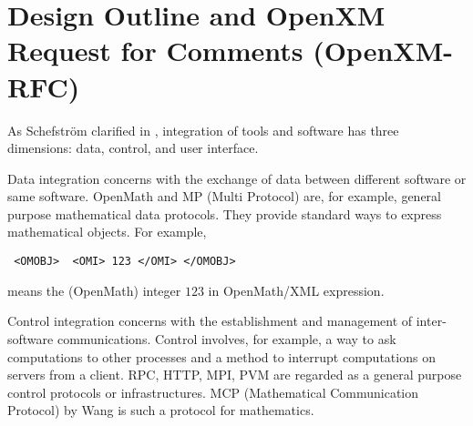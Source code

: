 
\section{Design Outline and OpenXM Request for Comments (OpenXM-RFC)} 

As Schefstr\"om clarified in \cite{schefstrom},
integration of tools and software has three dimensions:
data, control, and user interface.

Data integration concerns with the exchange of data between different
software or same software.
OpenMath \cite{OpenMath} and MP (Multi Protocol) \cite{GKW} are,
for example, general purpose mathematical data protocols.
They provide standard ways to express mathematical objects.
For example,
\begin{verbatim}
 <OMOBJ>  <OMI> 123 </OMI> </OMOBJ>
\end{verbatim}
means the (OpenMath) integer $123$ in OpenMath/XML expression.

Control integration concerns with the establishment and management of
inter-software communications.
Control involves, for example, a way to ask computations to other processes
and a method to interrupt computations on servers from a client.
RPC, HTTP, MPI, PVM are regarded as a general purpose control protocols or
infrastructures.
MCP (Mathematical Communication Protocol)
by Wang \cite{iamc} is such a protocol for mathematics.

